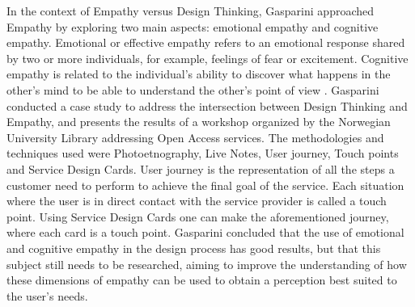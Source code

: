 \documentclass[conference]{IEEEtran}
\begin{document}

In the context of Empathy versus Design Thinking, Gasparini \cite{Gasparini} approached Empathy by exploring two main aspects: emotional empathy and cognitive empathy. Emotional or effective empathy refers to an emotional response shared by two or more individuals, for example, feelings of fear or excitement. Cognitive empathy is related to the individual's ability to discover what happens in the other's mind to be able to understand the other's point of view \cite{Newkimbell}. Gasparini \cite{Gasparini} conducted a case study to address the intersection between Design Thinking and Empathy, and presents the results of a workshop organized by the Norwegian University Library addressing Open Access services. The methodologies and techniques used were Photoetnography, Live Notes, User journey, Touch points and Service Design Cards. User journey is the representation of all the steps a customer need to perform to achieve the final goal of the service. Each situation where the user is in direct contact with the service provider is called a touch point. Using Service Design Cards one can make the aforementioned journey, where each card is a touch point. Gasparini \cite{Gasparini} concluded that the use of emotional and cognitive empathy in the design process has good results, but that this subject still needs to be researched, aiming to improve the understanding of how these dimensions of empathy can be used to obtain a perception best suited to the user's needs.
\end{document}

